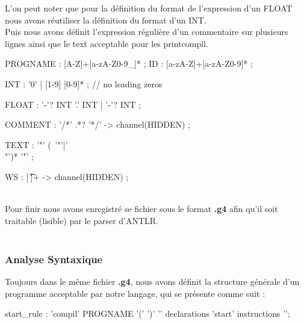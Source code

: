 \documentclass[12pt]{article}
\begin{document}
L'on peut noter que pour la définition du format de l'expression d'un FLOAT nous avons réutiliser la définition du format d'un INT.\\

Puis nous avons définit l'expression régulière d'un commentaire sur plusieurs lignes ainsi que le text acceptable pour les printcompil.\\

\begin{sql}

PROGNAME : [A-Z]+[a-zA-Z0-9_]* ;
ID : [a-zA-Z]+[a-zA-Z0-9]* ;

INT :   '0' | [1-9] [0-9]* ; // no leading zeros

FLOAT
    :   '-'? INT '.' INT
    |   '-'? INT
    ;


COMMENT : '/*' .*? '*/' -> channel(HIDDEN) ;

TEXT : '"' (~'"'|'\\"')* '"'  ;

WS : [ \t\n\r]+ -> channel(HIDDEN) ;

\end{sql}
\textbf{ }\\
Pour finir nous avons enregistré se fichier sous le format \textbf{.g4} afin qu'il soit traitable (lisible) par le parser d'ANTLR.\\

\textbf{ }\\
\subsubsection{Analyse Syntaxique}
Toujours dans le même fichier \textbf{.g4}, nous avons définit la structure générale d'un programme acceptable par notre langage, qui se présente comme suit :
\begin{sql}
start_rule : 'compil' PROGNAME '(' ')'
'{'
declarations
'start'
instructions
'}';
\end{sql}
\end{document}
